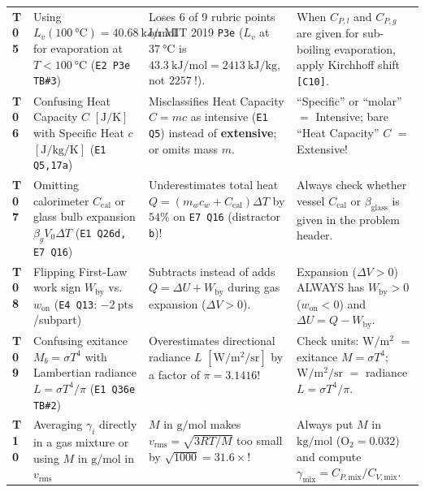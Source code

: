{\begin{tabularx}{\linewidth}{@{}l L{0.28\linewidth} X L{0.31\linewidth}@{}}
\textbf{T05} & Using $L_v(\SI{100}{\celsius}) = \SI{40.68}{\kilo\joule\per\mole}$ for evaporation at $T < \SI{100}{\celsius}$ (\texttt{E2 P3e TB\#3}) & Loses 6 of 9 rubric points on MIT 2019 \texttt{P3e} ($L_v$ at $\SI{37}{\celsius}$ is $\SI{43.3}{\kilo\joule\per\mole} = \SI{2413}{\kilo\joule\per\kilogram}$, not $\SI{2257}{}$!). & When $C_{P,l}$ and $C_{P,g}$ are given for sub-boiling evaporation, apply Kirchhoff shift \texttt{[C10]}. \\
\textbf{T06} & Confusing Heat Capacity $C$ $[\si{\joule\per\kelvin}]$ with Specific Heat $c$ $[\si{\joule\per\kilogram\per\kelvin}]$ (\texttt{E1 Q5,17a}) & Misclassifies Heat Capacity $C = mc$ as intensive (\texttt{E1 Q5}) instead of \textbf{extensive}; or omits mass $m$. & ``Specific'' or ``molar'' $=$ Intensive; bare ``Heat Capacity'' $C$ $=$ Extensive! \\
\textbf{T07} & Omitting calorimeter $C_{\mathrm{cal}}$ or glass bulb expansion $\beta_g V_0 \Delta T$ (\texttt{E1 Q26d, E7 Q16}) & Underestimates total heat $Q = (m_w c_w + C_{\mathrm{cal}})\Delta T$ by $54\%$ on \texttt{E7 Q16} (distractor \texttt{b})! & Always check whether vessel $C_{\mathrm{cal}}$ or $\beta_{\mathrm{glass}}$ is given in the problem header. \\
\textbf{T08} & Flipping First-Law work sign $W_{\mathrm{by}}$ vs.\ $w_{\mathrm{on}}$ (\texttt{E4 Q13}: $-\SI{2}{\text{pts}}$/subpart) & Subtracts instead of adds $Q = \Delta U + W_{\mathrm{by}}$ during gas expansion ($\Delta V > 0$). & Expansion ($\Delta V > 0$) ALWAYS has $W_{\mathrm{by}} > 0$ ($w_{\mathrm{on}} < 0$) and $\Delta U = Q - W_{\mathrm{by}}$. \\
\textbf{T09} & Confusing exitance $M_b = \sigma T^4$ with Lambertian radiance $L = \sigma T^4/\pi$ (\texttt{E1 Q36e TB\#2}) & Overestimates directional radiance $L$ $[\si{\watt\per\square\meter\per\steradian}]$ by a factor of $\pi = 3.1416$! & Check units: $\si{\watt\per\square\meter}$ $=$ exitance $M = \sigma T^4$; $\si{\watt\per\square\meter\per\steradian}$ $=$ radiance $L = \sigma T^4/\pi$. \\
\textbf{T10} & Averaging $\gamma_i$ directly in a gas mixture or using $M$ in $\si{\gram\per\mole}$ in $v_{\mathrm{rms}}$ & $M$ in $\si{\gram\per\mole}$ makes $v_{\mathrm{rms}} = \sqrt{3RT/M}$ too small by $\sqrt{1000} = 31.6\times$! & Always put $M$ in $\si{\kilogram\per\mole}$ ($\mathrm{O_2} = \num{0.032}$) and compute $\gamma_{\mathrm{mix}} = C_{P,\mathrm{mix}}/C_{V,\mathrm{mix}}$. \\

\end{tabularx}}
